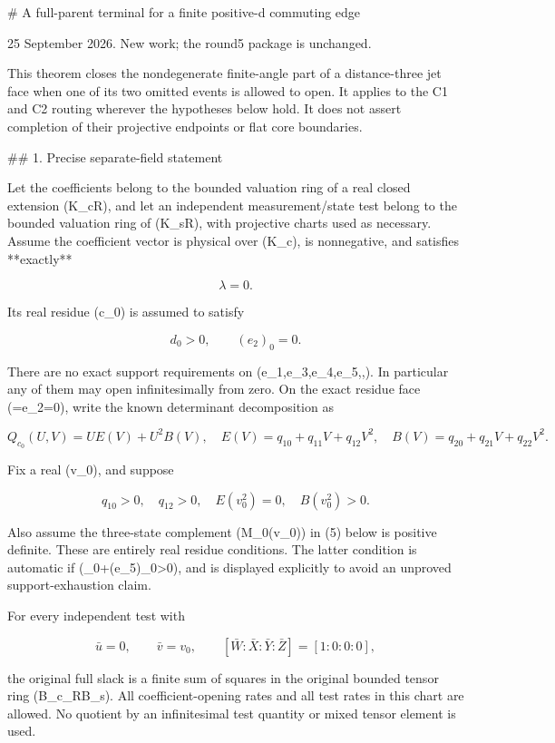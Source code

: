 # A full-parent terminal for a finite positive-d commuting edge

25 September 2026. New work; the round5 package is unchanged.

This theorem closes the nondegenerate finite-angle part of a distance-three
jet face when one of its two omitted events is allowed to open. It applies
to the C1 and C2 routing wherever the hypotheses below hold. It does not
assert completion of their projective endpoints or flat core boundaries.

## 1. Precise separate-field statement

Let the coefficients belong to the bounded valuation ring of a real closed
extension (K_c\supset\mathbb R), and let an independent measurement/state
test belong to the bounded valuation ring of (K_s\supset\mathbb R), with
projective charts used as necessary. Assume the coefficient vector is
physical over (K_c), is nonnegative, and satisfies **exactly**

\[
\lambda=0.
\]

Its real residue (c_0) is assumed to satisfy

\[
d_0>0,\qquad (e_2)_0=0.
\tag{1}
\]

There are no exact support requirements on (e_1,e_3,e_4,e_5,\alpha,\beta).
In particular any of them may open infinitesimally from zero. On the exact
residue face (\lambda=e_2=0), write the known determinant decomposition as

\[
Q_{c_0}(U,V)=U E(V)+U^2 B(V),
\quad E(V)=q_{10}+q_{11}V+q_{12}V^2,
\quad B(V)=q_{20}+q_{21}V+q_{22}V^2.
\tag{2}
\]

Fix a real (v_0), and suppose

\[
q_{10}>0,\quad q_{12}>0,\quad E(v_0^2)=0,\quad B(v_0^2)>0.
\tag{3}
\]

Also assume the three-state complement (M_0(v_0)) in (5) below is positive
definite. These are entirely real residue conditions. The latter condition
is automatic if (\alpha_0+(e_5)_0>0), and is displayed explicitly to avoid
an unproved support-exhaustion claim.

For every independent test with

\[
\bar u=0,\qquad \bar v=v_0,
\qquad [\bar W:\bar X:\bar Y:\bar Z]=[1:0:0:0],
\tag{4}
\]

the original full slack is a finite sum of squares in the original bounded
tensor ring (B_c\otimes_{\mathbb R}B_s). All coefficient-opening rates and
all test rates in this chart are allowed. No quotient by an infinitesimal
test quantity or mixed tensor element is used.


